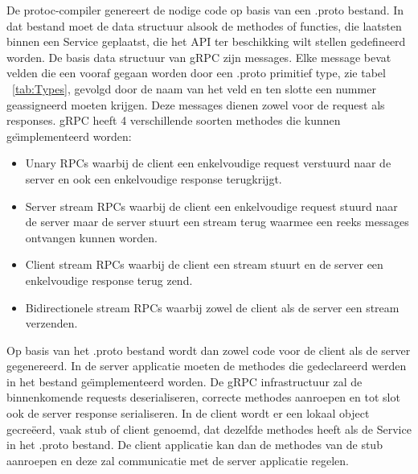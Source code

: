 De protoc-compiler genereert de nodige code op basis van een .proto bestand. In dat bestand moet de data structuur alsook de methodes
of functies, die laatsten binnen een Service geplaatst, die het API ter beschikking wilt stellen gedefineerd worden.
De basis data structuur van gRPC zijn messages. Elke message bevat velden
die een vooraf gegaan worden door een .proto primitief type, zie tabel ~\ref{tab:Types}, gevolgd door de naam van het veld en ten slotte een nummer
geassigneerd moeten krijgen. Deze messages dienen zowel voor de request als responses.
gRPC heeft 4 verschillende soorten methodes die kunnen ge\"{\i}mplementeerd worden:
\begin{itemize}
    \item Unary RPCs waarbij de client een enkelvoudige request verstuurd naar de server en ook een enkelvoudige response terugkrijgt.
    \item Server stream RPCs waarbij de client een enkelvoudige request stuurd naar de server maar de server stuurt een stream terug
    waarmee een reeks messages ontvangen kunnen worden.
    \item Client stream RPCs waarbij de client een stream stuurt en de server een enkelvoudige response terug zend.
    \item Bidirectionele stream RPCs waarbij zowel de client als de server een stream verzenden.
\end{itemize}
Op basis van het .proto bestand wordt dan zowel code voor de client als de server gegenereerd. In de server applicatie moeten de methodes die gedeclareerd werden
in het bestand ge\"{\i}mplementeerd worden. De gRPC infrastructuur zal de binnenkomende requests deserialiseren, correcte methodes aanroepen en tot slot ook
de server response serialiseren. In de client wordt er een lokaal object gecre\"eerd, vaak stub of client genoemd, dat dezelfde methodes heeft als de Service in
het .proto bestand. De client applicatie kan dan de methodes van de stub aanroepen en deze zal communicatie met de server applicatie regelen.\newline
~\autocite{grpcintroduction}\\
~\autocite{grpccoreconcepts}\\

